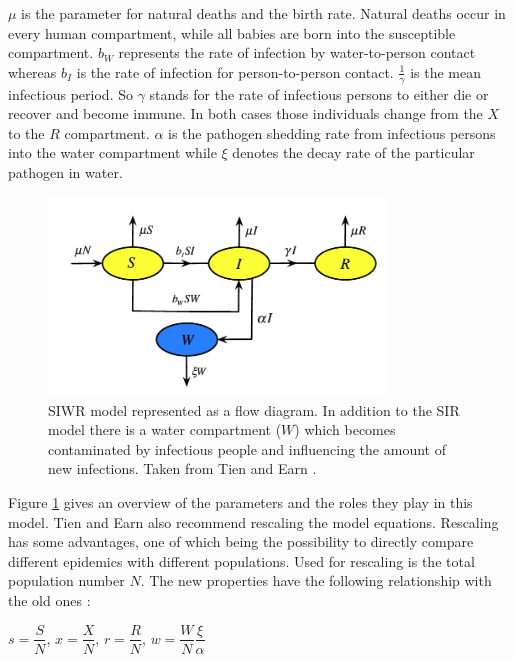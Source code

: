 \documentclass[11pt]{article}
\begin{document}
$ \mu $ is the parameter for natural deaths and the birth rate. Natural deaths occur in every human compartment, while all babies are born into the susceptible compartment. $ b_{W} $ represents the rate of infection by water-to-person contact whereas $ b_{I} $ is the rate of infection for person-to-person contact. $\frac{1}{\gamma } $ is the mean infectious period. So $ \gamma $ stands for the rate of infectious persons to either die or recover and become immune. In both cases those individuals change from the $ X $ to the $ R $ compartment. $ \alpha $ is the pathogen shedding rate from infectious persons into the water compartment while $ \xi $ denotes the decay rate of the particular pathogen in water.


\begin{center}
\begin{figure}
\includegraphics[width=0.8\textwidth]{Bilder/flow_diagram_SIWR.png}
\caption{SIWR model represented as a flow diagram. In addition to the SIR model there is a water compartment ($ W $) which becomes contaminated by infectious people and influencing the amount of new infections. Taken from Tien and Earn \cite{tien:2010}.}
\label{pic:flow_diagram}
\end{figure}
\end{center}

Figure \ref{pic:flow_diagram} gives an overview of the parameters and the roles they play in this model. Tien and Earn \cite{tien:2010} also recommend rescaling the model equations. Rescaling has some advantages, one of which being the possibility to directly compare different epidemics with different populations. Used for rescaling is the total population number $ N $. The new properties have the following relationship with the old ones \cite{tien:2010}: \\
\newline

\begin{center}
$ s=\dfrac{S}{N} $,	$ x=\dfrac{X}{N} $,	$ r=\dfrac{R}{N} $,	$ w=\dfrac{W}{N}\dfrac{\xi}{\alpha} $
\end{center}
\newline
\end{document}
